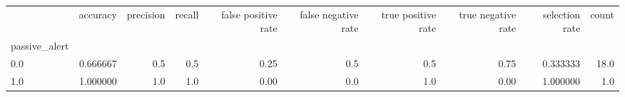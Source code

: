 \begin{tabular}{lrrrrrrrrr}
\toprule
{} &  accuracy &  precision &  recall &  false positive rate &  false negative rate &  true positive rate &  true negative rate &  selection rate &  count \\
passive\_alert &           &            &         &                      &                      &                     &                     &                 &        \\
\midrule
0.0           &  0.666667 &        0.5 &     0.5 &                 0.25 &                  0.5 &                 0.5 &                0.75 &        0.333333 &   18.0 \\
1.0           &  1.000000 &        1.0 &     1.0 &                 0.00 &                  0.0 &                 1.0 &                0.00 &        1.000000 &    1.0 \\
\bottomrule
\end{tabular}
